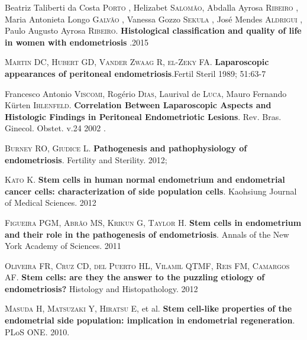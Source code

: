 \documentclass[12pt]{article} %
\begin{document}
\vspace{0,5cm}

Beatriz Taliberti da Costa \textsc{Porto} , Helizabet \textsc{Salomão}, Abdalla Ayrosa \textsc{Ribeiro} , Maria Antonieta Longo \textsc{Galvão} , Vanessa Gozzo \textsc{Sekula} , José Mendes \textsc{Aldrigui} , Paulo Augusto Ayrosa \textsc{Ribeiro}.
\textbf{Histological classification and quality of life in women with endometriosis} .2015

\vspace{0,5cm}

\textsc{Martin DC, Hubert GD, Vander Zwaag R, el-Zeky FA}. \textbf{Laparoscopic appearances of peritoneal endometriosis}.Fertil Steril 1989; 51:63-7

\vspace{0,5cm}

Francesco Antonio \textsc{Viscomi}, Rogério \textsc{Dias}, Laurival de \textsc{Luca}, Mauro Fernando Kürten \textsc{Ihlenfeld}. \textbf{Correlation Between Laparoscopic Aspects and Histologic Findings in Peritoneal Endometriotic Lesions}. Rev. Bras. Ginecol. Obstet. v.24 2002 .

\vspace{0,5cm}

\textsc{Burney RO, Giudice L}.\textbf{ Pathogenesis and pathophysiology of endometriosis}. Fertility and Sterility. 2012;

\vspace{0,5cm}

\textsc{Kato K}. \textbf{Stem cells in human normal endometrium and endometrial cancer cells: characterization of side population cells}. Kaohsiung Journal of Medical Sciences. 2012

\vspace{0,5cm}

\textsc{Figueira PGM, Abrão MS, Krikun G, Taylor H}.\textbf{ Stem cells in endometrium and their role in the pathogenesis of endometriosis}. Annals of the New York Academy of Sciences. 2011

\vspace{0,5cm}

\textsc{Oliveira FR, Cruz CD, del Puerto HL, Vilamil QTMF, Reis FM, Camargos AF}.\textbf{ Stem cells: are they the answer to the puzzling etiology of endometriosis?} Histology and Histopathology. 2012

\vspace{0,5cm}

\textsc{Masuda H, Matsuzaki Y, Hiratsu E}, et al.\textbf{ Stem cell-like properties of the endometrial side population: implication in endometrial regeneration}. PLoS ONE. 2010.
\end{document}
